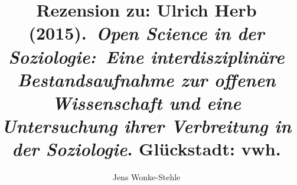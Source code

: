 
\fancyhead[R]{\thepage} %

\title{\LARGE{Rezension zu: Ulrich Herb (2015). \emph{Open Science in der Soziologie: Eine interdisziplinäre Bestandsaufnahme zur offenen Wissenschaft und eine Untersuchung ihrer Verbreitung in der Soziologie}. Glückstadt: vwh.
}} %
\author{Jens Wonke-Stehle} %

\setcounter{page}{177}